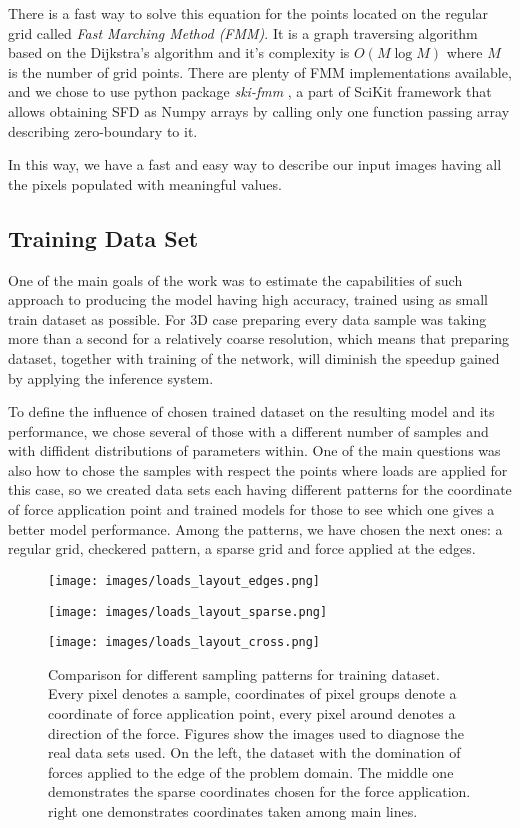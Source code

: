 There is a fast way to solve this equation for the points located on the regular grid called \emph{Fast Marching Method (FMM)}.
It is a graph traversing algorithm based on the Dijkstra's algorithm \cite{} and it's complexity is $O(M \log M)$ where $M$ is the number of grid points.
There are plenty of FMM implementations available, and we chose to use python package \emph{ski-fmm} \cite{scikit-fmm}, a part of SciKit framework that allows obtaining SFD as Numpy array\cite{}s by calling only one function passing array describing zero-boundary to it.
\medskip

In this way, we have a fast and easy way to describe our input images having all the pixels populated with meaningful values.
\medskip
\medskip
\subsection{Training Data Set}

One of the main goals of the work was to estimate the capabilities of such approach to producing the model having high accuracy, trained using as small train dataset as possible.
For 3D case preparing every data sample was taking more than a second for a relatively coarse resolution, which means that preparing dataset, together with training of the network, will diminish the speedup gained by applying the inference system.  
\medskip

To define the influence of chosen trained dataset on the resulting model and its performance, we chose several of those with a different number of samples and with diffident distributions of parameters within. 
One of the main questions was also how to chose the samples with respect the points where loads are applied for this case, so we created data sets each having different patterns for the coordinate of force application point and trained models for those to see which one gives a better model performance.
Among the patterns, we have chosen the next ones: a regular grid, checkered pattern, a sparse grid and force applied at the edges.

\begin{figure*}
\begin{multicols}{3}
	\texttt{[image: images/loads\_layout\_edges.png]}\par
	\texttt{[image: images/loads\_layout\_sparse.png]}\par
	\texttt{[image: images/loads\_layout\_cross.png]}\par
\end{multicols}
\label{fig:sampling_layout}
\caption{Comparison for different sampling patterns for training dataset. Every pixel denotes a sample, coordinates of pixel groups denote a coordinate of force application point, every pixel around denotes a direction of the force. Figures show the images used to diagnose the real data sets used. On the left, the dataset with the domination of forces applied to the edge of the problem domain. The middle one demonstrates the sparse coordinates chosen for the force application. right one demonstrates coordinates taken among main lines.   
}
\end{figure*}
\medskip
 
